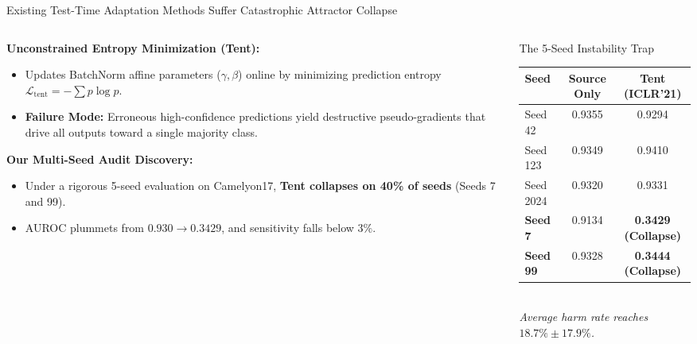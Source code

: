 \documentclass[aspectratio=169,10pt]{beamer}
\begin{document}
\begin{frame}{Existing Test-Time Adaptation Methods Suffer Catastrophic Attractor Collapse}
    \begin{columns}[T]
        \begin{column}{0.55\textwidth}
            \textbf{Unconstrained Entropy Minimization (Tent):}
            \begin{itemize}
                \item Updates BatchNorm affine parameters ($\gamma, \beta$) online by minimizing prediction entropy $\mathcal{L}_{\text{tent}} = -\sum p \log p$.
                \item \alert{\textbf{Failure Mode:}} Erroneous high-confidence predictions yield destructive pseudo-gradients that drive all outputs toward a single majority class.
            \end{itemize}
            \vspace{0.2cm}
            \textbf{Our Multi-Seed Audit Discovery:}
            \begin{itemize}
                \item Under a rigorous 5-seed evaluation on Camelyon17, \alert{\textbf{Tent collapses on 40\% of seeds}} (Seeds 7 and 99).
                \item AUROC plummets from $0.930 \to \mathbf{0.3429}$, and sensitivity falls below $3\%$.
            \end{itemize}
        \end{column}
        \begin{column}{0.42\textwidth}
            \begin{alertblock}{The 5-Seed Instability Trap}
                \small
                \begin{tabular}{lcc}
                    \toprule
                    \textbf{Seed} & \textbf{Source Only} & \textbf{Tent (ICLR'21)} \\
                    \midrule
                    Seed 42 & 0.9355 & 0.9294 \\
                    Seed 123 & 0.9349 & 0.9410 \\
                    Seed 2024 & 0.9320 & 0.9331 \\
                    \textbf{Seed 7} & 0.9134 & \alert{\textbf{0.3429 (Collapse)}} \\
                    \textbf{Seed 99} & 0.9328 & \alert{\textbf{0.3444 (Collapse)}} \\
                    \bottomrule
                \end{tabular}
                \vspace{0.1cm}\\
                \textit{Average harm rate reaches $18.7\% \pm 17.9\%$.}
            \end{alertblock}
        \end{column}
    \end{columns}
\end{frame}
\end{document}
